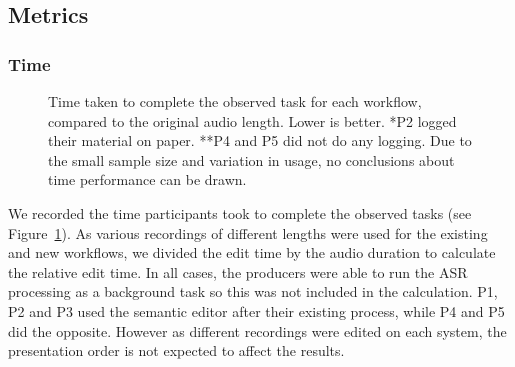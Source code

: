 



\subsection{Metrics}\label{sec:resultsmetrics}
\subsubsection{Time}

\begin{figure}
\centering
  \caption{Time taken to complete the observed task for each workflow, compared to the original audio length. Lower is
    better. *P2 logged their material on paper. **P4 and P5 did not do any logging. Due to the small sample size and
    variation in usage, no conclusions about time performance can be drawn.}
  \label{fig:time} \end{figure}

We recorded the time participants took to complete the observed tasks (see Figure~\ref{fig:time}). As various
recordings of different lengths were used for the existing and new workflows, we divided the edit time by the audio
duration to calculate the relative edit time.  In all cases, the producers were able to run the ASR processing as a
background task so this was not included in the calculation. P1, P2 and P3 used the semantic editor after their
existing process, while P4 and P5 did the opposite. However as different recordings were edited on each system, the
presentation order is not expected to affect the results.

